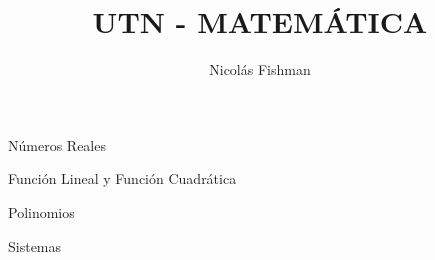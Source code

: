 \documentclass[12pt]{report}
\title{UTN - MATEMÁTICA}
\author{Nicolás Fishman}
\date{}
\begin{document}
\maketitle
\tableofcontents

\begin{itemize}
    {\item Números Reales}
     {\item Función Lineal y Función Cuadrática}
\end{itemize}





\begin{itemize}
    {\item Polinomios}
     {\item Sistemas}
\end{itemize}



\end{document}
